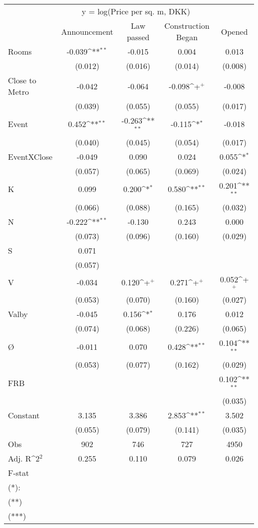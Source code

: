{
\def\sym#1{\ifmmode^{#1}\else\(^{#1}\)\fi}
\begin{tabular}{@{\extracolsep{2pt}}l*{4}{c}@{}}
\hline\hline
& \multicolumn{3}{c}{y = log(Price per sq. m, DKK)} \\
\cline{2-4}
 & Announcement & Law passed & Construction Began & Opened \\
\hline
Rooms & -0.039\sym{**} & -0.015 & 0.004 & 0.013 \\
 & (0.012) & (0.016) & (0.014) & (0.008) \\
Close to Metro & -0.042 & -0.064 & -0.098\sym{+} & -0.008 \\
 & (0.039) & (0.055) & (0.055) & (0.017) \\
Event & 0.452\sym{**} & -0.263\sym{**} & -0.115\sym{*} & -0.018 \\
 & (0.040) & (0.045) & (0.054) & (0.017) \\
EventXClose & -0.049 & 0.090 & 0.024 & 0.055\sym{*} \\
 & (0.057) & (0.065) & (0.069) & (0.024) \\
K & 0.099 & 0.200\sym{*} & 0.580\sym{**} & 0.201\sym{**} \\
 & (0.066) & (0.088) & (0.165) & (0.032) \\
N & -0.222\sym{**} & -0.130 & 0.243 & 0.000 \\
 & (0.073) & (0.096) & (0.160) & (0.029) \\
S & 0.071 &  &  &  \\
 & (0.057) &  &  &  \\
V & -0.034 & 0.120\sym{+} & 0.271\sym{+} & 0.052\sym{+} \\
 & (0.053) & (0.070) & (0.160) & (0.027) \\
Valby & -0.045 & 0.156\sym{*} & 0.176 & 0.012 \\
 & (0.074) & (0.068) & (0.226) & (0.065) \\
Ø & -0.011 & 0.070 & 0.428\sym{**} & 0.104\sym{**} \\
 & (0.053) & (0.077) & (0.162) & (0.029) \\
FRB &  &  &  & 0.102\sym{**} \\
 &  &  &  & (0.035) \\
Constant & 3.135 & 3.386 & 2.853\sym{**} & 3.502 \\
 & (0.055) & (0.079) & (0.141) & (0.035) \\

\hline
Obs & 902 & 746 & 727 & 4950 \\
Adj. R\sym{2} & 0.255 & 0.110 & 0.079 & 0.026 \\
F-stat &  &  &  &  \\
\hline\hline
\multicolumn{5}{l}{\footnotesize (*): } \\
\multicolumn{5}{l}{\footnotesize (**)} \\
\multicolumn{5}{l}{\footnotesize (***)} \\
\end{tabular}
}